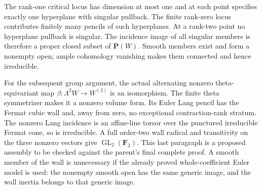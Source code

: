 The rank-one critical locus has dimension at most one and at each
point specifies exactly one hyperplane with singular pullback. The
finite rank-zero locus contributes finitely many pencils of such
hyperplanes. At a rank-two point no hyperplane pullback is singular.
The incidence image of all singular members is therefore a proper
closed subset of \(\mathbf P(W)\). Smooth members exist and form a
nonempty open; ample cohomology vanishing makes them connected and
hence irreducible.

For the subsequent group argument, the actual alternating nonzero
theta-equivariant map \(\beta:\Lambda^2W\to W^{(2)}\) is an
isomorphism. The finite theta symmetrizer makes it a nonzero volume
form. Its Euler Lang pencil has the Fermat cubic wall and, away from
zero, no exceptional contraction-rank stratum. The nonzero Lang
incidence is an affine-line torsor over the punctured irreducible
Fermat cone, so is irreducible. A full order-two wall radical and
transitivity on the three nonzero vectors give \(\operatorname{GL}_2
(\mathbf F_2)\). This last paragraph is a proposed assembly to be
checked against the parent's final complete proof. A smooth member
of the wall is unnecessary if the already proved whole-coefficient
Euler model is used: the nonempty smooth open has the same generic
image, and the wall inertia belongs to that generic image.
